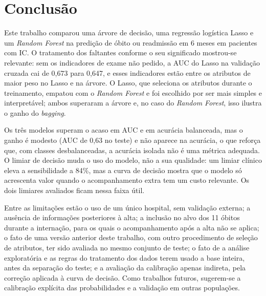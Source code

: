 \documentclass[conference]{IEEEtran}
\begin{document}
\section{Conclusão}

Este trabalho comparou uma árvore de decisão, uma regressão logística Lasso e um \textit{Random Forest} na predição de óbito ou readmissão em 6 meses em pacientes com IC. O tratamento dos faltantes conforme o seu significado mostrou-se relevante: sem os indicadores de exame não pedido, a AUC do Lasso na validação cruzada cai de 0,673 para 0,647, e esses indicadores estão entre os atributos de maior peso no Lasso e na árvore. O Lasso, que seleciona os atributos durante o treinamento, empatou com o \textit{Random Forest} e foi escolhido por ser mais simples e interpretável; ambos superaram a árvore e, no caso do \textit{Random Forest}, isso ilustra o ganho do \textit{bagging}.

Os três modelos superam o acaso em AUC e em acurácia balanceada, mas o ganho é modesto (AUC de 0,63 no teste) e não aparece na acurácia, o que reforça que, com classes desbalanceadas, a acurácia isolada não é uma métrica adequada. O limiar de decisão muda o uso do modelo, não a sua qualidade: um limiar clínico eleva a sensibilidade a 84\%, mas a curva de decisão mostra que o modelo só acrescenta valor quando o acompanhamento extra tem um custo relevante. Os dois limiares avaliados ficam nessa faixa útil.

Entre as limitações estão o uso de um único hospital, sem validação externa; a ausência de informações posteriores à alta; a inclusão no alvo dos 11 óbitos durante a internação, para os quais o acompanhamento após a alta não se aplica; o fato de uma versão anterior deste trabalho, com outro procedimento de seleção de atributos, ter sido avaliada no mesmo conjunto de teste; o fato de a análise exploratória e as regras do tratamento dos dados terem usado a base inteira, antes da separação do teste; e a avaliação da calibração apenas indireta, pela correção aplicada à curva de decisão. Como trabalhos futuros, sugerem-se a calibração explícita das probabilidades e a validação em outras populações.
\end{document}
